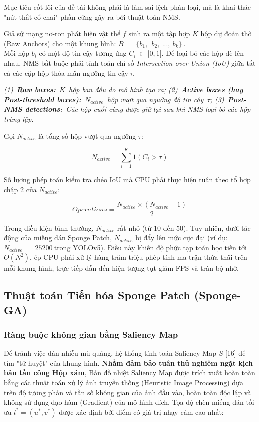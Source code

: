 \documentclass[a4paper,fleqn]{cas-dc}
\begin{document}
Mục tiêu cốt lõi của đề tài không phải là làm sai lệch phân loại, mà là
khai thác "nút thắt cổ chai" phần cứng gây ra bởi thuật toán NMS.

Giả sử mạng nơ-ron phát hiện vật thể \(f\) sinh ra một tập hợp \(K\) hộp
dự đoán thô (Raw Anchors) cho một khung hình:
\(B\  = \ \{ b_{1},\ \ b_{2},\ ...,\ b_{k}\}\ .\)\\
Mỗi hộp \(b_{i}\) có một độ tin cậy tương ứng
\(C_{i}\  \in \ \lbrack 0,1\rbrack\). Để loại bỏ các hộp đè lên nhau,
NMS bắt buộc phải tính toán chỉ số \emph{Intersection over Union (IoU)}
giữa tất cả các cặp hộp thỏa mãn ngưỡng tin cậy\(\ \tau\).

\emph{(1)~\textbf{Raw boxes:}~}\(K\)\emph{~hộp ban đầu do mô hình tạo
ra; (2)~\textbf{Active boxes (hay Post-threshold
boxes):}~}\(N_{active}\)\emph{~hộp vượt qua ngưỡng độ tin
cậy~}\(\tau\)\emph{; (3)~\textbf{Post-NMS detections:}~Các hộp cuối cùng
được giữ lại sau khi NMS loại bỏ các hộp trùng lặp.}

Gọi \(N_{active}\) là tổng số hộp vượt qua ngưỡng \(\tau\):

\[N_{active} = \sum_{i = 1}^{K}1\left( C_{i} > \tau \right)\]

Số lượng phép toán kiểm tra chéo IoU mà CPU phải thực hiện tuân theo tổ
hợp chập 2 của \(N_{active}\):

\[Operations = \frac{N_{active} \times \left( N_{active} - 1 \right)}{2}\]

Trong điều kiện bình thường, \(N_{active}\) rất nhỏ (từ 10 đến 50). Tuy
nhiên, dưới tác động của miếng dán Sponge Patch, \(N_{active}\) bị đẩy
lên mức cực đại (ví dụ: \(N_{active}\  = \ 25200\ \)trong YOLOv5). Điều
này khiến độ phức tạp toán học tiến tới \(O(N^{2})\), ép CPU phải xử lý
hàng trăm triệu phép tính ma trận thừa thãi trên mỗi khung hình, trực
tiếp dẫn đến hiện tượng tụt giảm FPS và tràn bộ nhớ.

\subsection{Thuật toán Tiến hóa Sponge Patch (Sponge-GA)}



\subsubsection{Ràng buộc không gian bằng Saliency Map}



Để tránh việc dán nhiễu mù quáng, hệ thống tính toán Saliency Map \(S\)
{[}16{]} để tìm "tử huyệt" của khung hình. \textbf{Nhằm đảm bảo tuân thủ
nghiêm ngặt kịch bản tấn công Hộp xám}, Bản đồ nhiệt Saliency Map được
trích xuất hoàn toàn bằng các thuật toán xử lý ảnh truyền thống
(Heuristic Image Processing) dựa trên độ tương phản và tần số không gian
của ảnh đầu vào, hoàn toàn độc lập và không sử dụng đạo hàm (Gradient)
của mô hình đích. Tọa độ chèn miếng dán tối ưu
\(l^{*} = \left( u^{*},v^{*} \right)\) được xác định bởi điểm có giá trị
nhạy cảm cao nhất:
\end{document}
